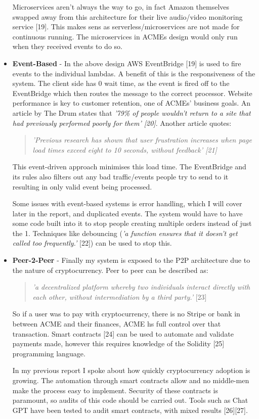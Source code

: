 \begin{itemize}
    Microservices aren't always the way to go, in fact Amazon themselves swapped away from this architecture for their live audio/video monitoring service [19].
    This makes sens as serverless/microservices are not made for continuous running. The microservices in ACMEs design would only run when they received events
    to do so.

    \item \textbf{Event-Based} - In the above design AWS EventBridge [19] is used to fire events to the individual lambdas. A benefit of this is the 
    responsiveness of the system. The client side has 0 wait time, as the event is fired off to the EventBridge which then routes the message to the correct 
    processor. Website performance is key to customer retention, one of ACMEs' business goals. An article by The Drum states that \textit{'79\% of people 
    wouldn't return to a site that had previously performed poorly for them' [20]}. Another article quotes:
    \begin{quote}
      \textit{'Previous research has shown that user frustration increases when page load times exceed eight to 10 seconds, without feedback' [21]}
    \end{quote}
    This event-driven approach minimises this load time. The EventBridge and its rules also filters out any bad traffic/events people try to send to it
    resulting in only valid event being processed.

    Some issues with event-based systems is error handling, which I will cover later in the report, and duplicated events. The system would have to have 
    some code built into it to stop people creating multiple orders instead of just the 1. Techniques like debouncing (\textit {'a function ensures that 
    it doesn't get called too frequently.'} [22]) can be used to stop this. 

    \item \textbf{Peer-2-Peer} - Finally my system is exposed to the P2P architecture due to the nature of cryptocurrency. Peer to peer can be described as:
    \begin{quote}
      \textit{'a decentralized platform whereby two individuals interact directly with each other, without intermediation 
      by a third party.'} [23]
    \end{quote}

    So if a user was to pay with cryptocurrency, there is no Stripe or bank in between ACME and their finances, ACME hs full control over that transaction.
    Smart contracts [24] can be used to automate and validate payments made, however this requires knowledge of the Solidity [25] programming language. 
    
    In my previous report I spoke about how quickly cryptocurrency adoption is growing. The automation through smart contracts allow and no middle-men 
    make the process easy to implement. Security of these contracts is paramount, so audits of this code should be carried out. Tools such as Chat GPT have been 
    tested to audit smart contracts, with mixed results [26][27].

  \end{itemize}

\newpage